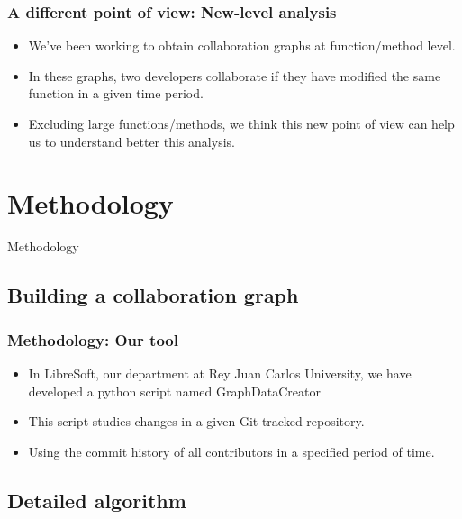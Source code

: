 \documentclass{beamer}
\begin{document}
\begin{frame}
\frametitle{A different point of view: New-level analysis}
\begin{itemize}
\item We've been working to obtain collaboration graphs at function/method level.
\item In these graphs, two developers collaborate if they have modified the same function in a given time period.
\item Excluding large functions/methods, we think this new point of view can help us to understand better this analysis.
\end{itemize}
\end{frame}

\section{Methodology}
\begin{frame}
\Huge{\centerline{Methodology}}
\end{frame}
\subsection{Building a collaboration graph}
\begin{frame}
\frametitle{Methodology: Our tool}
\begin{itemize}
\item In LibreSoft, our department at Rey Juan Carlos University,
we have developed a python script named GraphDataCreator 
\item This script studies changes in a given 
Git-tracked repository.
\item Using the commit history of all contributors in a specified period of time.
\end{itemize}
\end{frame}

\subsection{Detailed algorithm}
\end{document}

